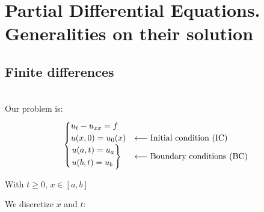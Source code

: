 \section{Partial Differential Equations. Generalities on their solution}

\subsection{Finite differences}

\begin{example}
  \-\\Our problem is:
  \[
    \begin{cases}
      u_t - u_{xx} = f\\
      u(x,0) = u_0(x) &\longleftarrow\text{Initial condition (IC)}\\
      \begin{rcases}
        u(a,t) = u_a \\
        u(b,t) = u_b
      \end{rcases} &\longleftarrow\text{Boundary conditions (BC)}\\
    \end{cases}
  \]
  
  With $t\geq 0, \, x\in[a,b]$
\end{example}

We discretize $x$ and $t$:

